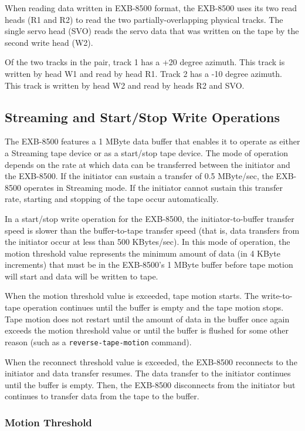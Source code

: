\documentclass[11pt]{article}
\begin{document}
When reading data written in EXB-8500 format, the EXB-8500 uses its two read
heads (R1 and R2) to read the two partially-overlapping physical tracks. The
single servo head (SVO) reads the servo data that was written on the tape by
the second write head (W2).

Of the two tracks in the pair, track 1 has a +20 degree azimuth. This track
is written by head W1 and read by head R1. Track 2 has a -10 degree azimuth.
This track is written by head W2 and read by heads R2 and SVO.

\subsection {Streaming and Start/Stop Write Operations}

The EXB-8500 features a 1 MByte data buffer that enables it to operate as
either a Streaming tape device or as a start/stop tape device. The mode of
operation depends on the rate at which data can be transferred between the
initiator and the EXB-8500. If the initiator can sustain a transfer of 0.5
MByte/sec, the EXB-8500 operates in Streaming mode. If the initiator cannot
sustain this transfer rate, starting and stopping of the tape occur
automatically.

In a start/stop write operation for the EXB-8500, the initiator-to-buffer
transfer speed is slower than the buffer-to-tape transfer speed (that is,
data transfers from the initiator occur at less than 500 KBytes/sec). In
this mode of operation, the motion threshold value represents the minimum
amount of data (in 4 KByte increments) that must be in the EXB-8500's
1 MByte buffer before tape motion will start and data will be written to
tape.

When the motion threshold value is exceeded, tape motion starts. The
write-to-tape operation continues until the buffer is empty and the tape
motion stops. Tape motion does not restart until the amount of data in the
buffer once again exceeds the motion threshold value or until the buffer is
flushed for some other reason (such as a {\tt reverse-tape-motion} command).

When the reconnect threshold value is exceeded, the EXB-8500 reconnects to
the initiator and data transfer resumes. The data transfer to the initiator
continues until the buffer is empty. Then, the EXB-8500 disconnects from the
initiator but continues to transfer data from the tape to the buffer.

\subsubsection {Motion Threshold}
\end{document}
